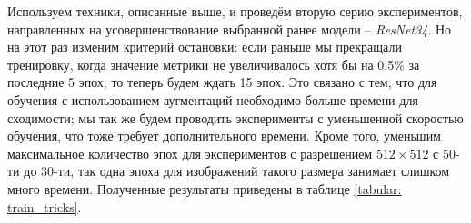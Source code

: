 \bigbreak
\indent
\indent
Используем техники, описанные выше, и проведём вторую серию 
экспериментов, направленных на усовершенствование
 выбранной ранее модели --
\textit{ResNet34}. Но на этот раз изменим критерий остановки: если раньше мы 
прекращали тренировку, когда значение метрики не увеличивалось хотя бы 
на 0.5\% за последние 5 эпох, то теперь будем ждать 15 эпох. Это связано
с тем, что для обучения с использованием аугментаций необходимо
больше времени для сходимости; мы так же будем
проводить эксперименты с уменьшенной
скоростью обучения, что тоже требует дополнительного времени.
Кроме того, уменьшим максимальное количество эпох для экспериментов
с разрешением $512 \times 512$ с 50-ти до 30-ти, так одна эпоха 
для изображений такого размера занимает слишком много времени.
Полученные результаты приведены в таблице \ref{tabular: train_tricks}.


